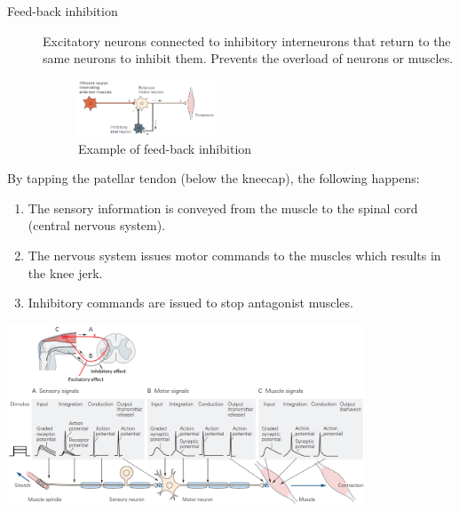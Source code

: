 \begin{description}
\begin{description}
\begin{description}
                    \item[Feed-back inhibition] 
                        Excitatory neurons connected to inhibitory interneurons that return to the same neurons to inhibit them.
                        Prevents the overload of neurons or muscles.
                        \begin{figure}[H]
                            \centering
                            \includegraphics[width=0.4\textwidth]{./img/feedback_inhibition.png}
                            \caption{Example of feed-back inhibition}
                        \end{figure}
                \end{description}
        \end{description}
\end{description}



\begin{casestudy}
    By tapping the patellar tendon (below the kneecap), the following happens:
    \begin{enumerate}
        \item The sensory information is conveyed from the muscle to the spinal cord (central nervous system).
        \item The nervous system issues motor commands to the muscles which results in the knee jerk.
        \item Inhibitory commands are issued to stop antagonist muscles.
    \end{enumerate}

    \begin{center}
        \includegraphics[width=0.8\textwidth]{./img/knee_jerk.png}
    \end{center}
\end{casestudy}


